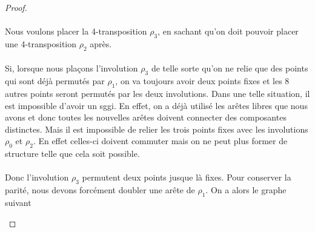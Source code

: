 \begin{proof}
  \paragraph{}
  Nous voulons placer la 4-transposition $\rho_3$, en sachant qu'on doit pouvoir placer une 4-transposition $\rho_2$ après.

  \paragraph{}
  Si, lorsque nous plaçons l'involution $\rho_3$ de telle sorte qu'on ne relie que des points qui sont déjà permutés par $\rho_1$, on va toujours avoir deux points fixes et les 8 autres points seront permutés par les deux involutions. Dans une telle situation, il est impossible d'avoir un sggi. En effet, on a déjà utilisé les arêtes libres que nous avons et donc toutes les nouvelles arêtes doivent connecter des composantes distinctes. Mais il est impossible de relier les trois points fixes avec les involutions $\rho_0$ et $\rho_2$. En effet celles-ci doivent commuter mais on ne peut plus former de structure telle que cela soit possible.

  \paragraph{}
  Donc l'involution $\rho_3$ permutent deux points jusque là fixes. Pour conserver la parité, nous devons forcément doubler une arête de $\rho_1$. On a alors le graphe suivant

  \begin{figure}[H]
    \begin{center}
\end{center}
\end{figure}
\end{proof}
